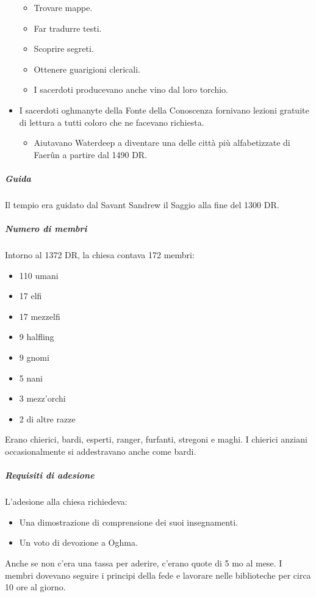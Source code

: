 \documentclass{article}
\begin{document}
\begin{itemize}
\begin{itemize}
                    \item Trovare mappe.
                    \item Far tradurre testi.
                    \item Scoprire segreti.
                    \item Ottenere guarigioni clericali.
                    \item I sacerdoti producevano anche vino dal loro torchio.
                \end{itemize}
                \item I sacerdoti oghmanyte della Fonte della Conoscenza fornivano lezioni gratuite di lettura a tutti coloro che ne facevano richiesta.
                \begin{itemize}
                    \item Aiutavano Waterdeep a diventare una delle città più alfabetizzate di Faerûn a partire dal 1490 DR.
                \end{itemize}
            \end{itemize}

                                \subparagraph{Guida}
                    Il tempio era guidato dal Savant Sandrew il Saggio alla fine del 1300 DR.

                    \subparagraph{Numero di membri}
                    Intorno al 1372 DR, la chiesa contava 172 membri:
                    \begin{itemize}
                        \item 110 umani
                        \item 17 elfi
                        \item 17 mezzelfi
                        \item 9 halfling
                        \item 9 gnomi
                        \item 5 nani
                        \item 3 mezz'orchi
                        \item 2 di altre razze
                    \end{itemize}
                    Erano chierici, bardi, esperti, ranger, furfanti, stregoni e maghi. I chierici anziani occasionalmente si addestravano anche come bardi.

                    \subparagraph{Requisiti di adesione}
                    L'adesione alla chiesa richiedeva:
                    \begin{itemize}
                        \item Una dimostrazione di comprensione dei suoi insegnamenti.
                        \item Un voto di devozione a Oghma.
                    \end{itemize}
                    Anche se non c'era una tassa per aderire, c'erano quote di 5 mo al mese. I membri dovevano seguire i principi della fede e lavorare nelle biblioteche per circa 10 ore al giorno.
\end{document}
